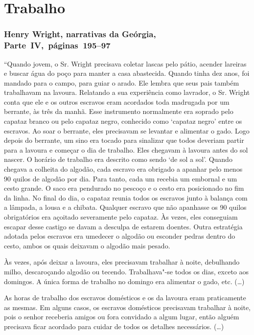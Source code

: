 \chapter{Trabalho}

\subsection{Henry Wright, narrativas da Geórgia, Parte~IV,~páginas~195--97}
\label{ref316}

``Quando jovem, o Sr. Wright precisava coletar lascas pelo pátio,
acender lareiras e buscar água do poço para manter a casa abastecida.
Quando tinha dez anos, foi mandado para o campo, para guiar o arado. Ele
lembra que seus pais também trabalhavam na lavoura. Relatando a sua
experiência como lavrador, o Sr. Wright conta que ele e os outros
escravos eram acordados toda madrugada por um berrante, às três da
manhã. Esse instrumento normalmente era soprado pelo capataz branco ou
pelo capataz negro, conhecido como `capataz negro' entre os escravos. Ao
soar o berrante, eles precisavam se levantar e alimentar o gado. Logo
depois do berrante, um sino era tocado para sinalizar que todos deveriam
partir para a lavoura e começar o dia de trabalho. Eles chegavam à
lavoura antes do sol nascer. O horário de trabalho era descrito como
sendo `de sol a sol'. Quando chegava a colheita do algodão, cada escravo
era obrigado a apanhar pelo menos 90 quilos de algodão por dia. Para tanto,
cada um recebia um embornal e um cesto grande. O saco era pendurado no
pescoço e o cesto era posicionado no fim da linha. No final do dia, o
capataz reunia todos os escravos junto à balança com a lâmpada, a lousa
e a chibata. Qualquer escravo que não apanhasse os 90 quilos obrigatórios
era açoitado severamente pelo capataz. Às vezes, eles conseguiam escapar
desse castigo se davam a desculpa de estarem doentes. Outra estratégia
adotada pelos escravos era umedecer o algodão ou esconder pedras dentro
do cesto, ambos os quais deixavam o algodão mais pesado.

Às vezes, após deixar a lavoura, eles precisavam trabalhar à noite,
debulhando milho, descaroçando algodão ou tecendo. Trabalhava"-se todos
os dias, exceto aos domingos. A única forma de trabalho no domingo era
alimentar o gado, etc. (\ldots{})

As horas de trabalho dos escravos domésticos e os da lavoura eram
praticamente as mesmas. Em alguns casos, os escravos domésticos
precisavam trabalhar à noite, pois o senhor receberia amigos ou fora
convidado a algum lugar, então alguém precisava ficar acordado para
cuidar de todos os detalhes necessários. (\ldots{})

